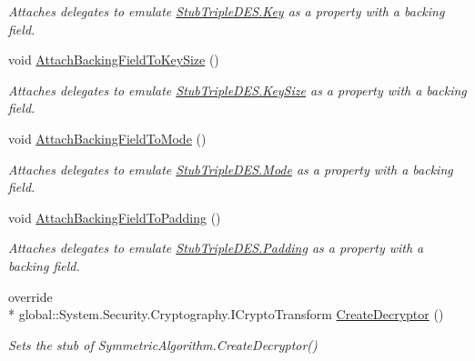 \begin{DoxyCompactItemize}
\begin{DoxyCompactList}\small\item\em Attaches delegates to emulate \hyperlink{class_system_1_1_security_1_1_cryptography_1_1_fakes_1_1_stub_triple_d_e_s_af5a79ccb5fc3933f77ed8e5a08739281}{Stub\-Triple\-D\-E\-S.\-Key} as a property with a backing field.\end{DoxyCompactList}\item 
void \hyperlink{class_system_1_1_security_1_1_cryptography_1_1_fakes_1_1_stub_triple_d_e_s_a3526f7bf96d533050ecac6a3c2c3a5fa}{Attach\-Backing\-Field\-To\-Key\-Size} ()
\begin{DoxyCompactList}\small\item\em Attaches delegates to emulate \hyperlink{class_system_1_1_security_1_1_cryptography_1_1_fakes_1_1_stub_triple_d_e_s_a3ebc35a3b708d68bb6e766b998b5b8a1}{Stub\-Triple\-D\-E\-S.\-Key\-Size} as a property with a backing field.\end{DoxyCompactList}\item 
void \hyperlink{class_system_1_1_security_1_1_cryptography_1_1_fakes_1_1_stub_triple_d_e_s_ac52a7671d6f527a9d065f2c802d68bca}{Attach\-Backing\-Field\-To\-Mode} ()
\begin{DoxyCompactList}\small\item\em Attaches delegates to emulate \hyperlink{class_system_1_1_security_1_1_cryptography_1_1_fakes_1_1_stub_triple_d_e_s_ae0fffd2b130fae75b40c0e72524c13c3}{Stub\-Triple\-D\-E\-S.\-Mode} as a property with a backing field.\end{DoxyCompactList}\item 
void \hyperlink{class_system_1_1_security_1_1_cryptography_1_1_fakes_1_1_stub_triple_d_e_s_aa8688e1b6dae4c045f8eb87ba9c7bd5e}{Attach\-Backing\-Field\-To\-Padding} ()
\begin{DoxyCompactList}\small\item\em Attaches delegates to emulate \hyperlink{class_system_1_1_security_1_1_cryptography_1_1_fakes_1_1_stub_triple_d_e_s_adee45d60407a85282f75d8164da1d5d6}{Stub\-Triple\-D\-E\-S.\-Padding} as a property with a backing field.\end{DoxyCompactList}\item 
override \\*
global\-::\-System.\-Security.\-Cryptography.\-I\-Crypto\-Transform \hyperlink{class_system_1_1_security_1_1_cryptography_1_1_fakes_1_1_stub_triple_d_e_s_a9efd5d9cebc0c0e7bebdb1d13053a27f}{Create\-Decryptor} ()
\begin{DoxyCompactList}\small\item\em Sets the stub of Symmetric\-Algorithm.\-Create\-Decryptor()\end{DoxyCompactList}\item 

\end{DoxyCompactItemize}

